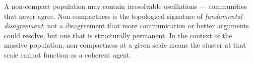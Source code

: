 \begin{remark}
A non-compact population may contain irresolvable oscillations ---
communities that never agree.
Non-compactness is the topological signature of
\emph{fundamental disagreement}: not a disagreement that more
communication or better arguments could resolve, but one that is
structurally permanent.
In the context of the massive population, non-compactness at a
given scale means the cluster at that scale cannot function as a
coherent agent.
\end{remark}

